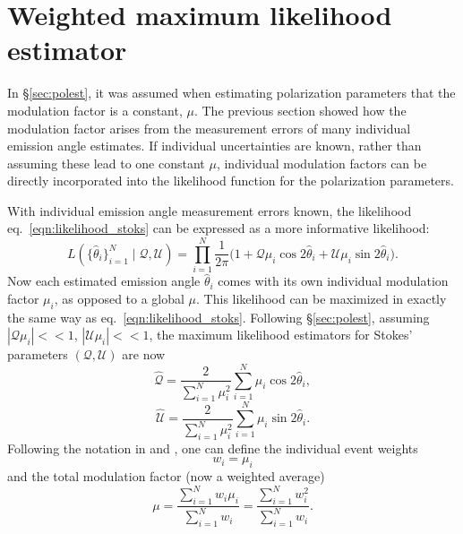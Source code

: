 \section{Weighted maximum likelihood estimator}
In \S\ref{sec:polest}, it was assumed when estimating polarization parameters that the modulation factor is a constant, $\mu$. The previous section showed how the modulation factor arises from the measurement errors of many individual emission angle estimates. If individual uncertainties are known, rather than assuming these lead to one constant $\mu$, individual modulation factors can be directly incorporated into the likelihood function for the polarization parameters. 

With individual emission angle measurement errors known, the likelihood eq.~\ref{eqn:likelihood_stoks} can be expressed as a more informative likelihood:
\begin{equation}
    L(\{\hat{\theta}_i\}_{i=1}^N\mid\mathcal{Q},\mathcal{U}) =  \prod_{i=1}^N\frac{1}{2\pi} \big(1 + \mathcal{Q}\mu_i\cos2\hat{\theta}_i + \mathcal{U}\mu_i\sin2\hat{\theta}_i \big).
    \label{eqn:prob_stoks}
\end{equation}
Now each estimated emission angle $\hat{\theta}_i$ comes with its own individual modulation factor $\mu_i$, as opposed to a global $\mu$. This likelihood can be maximized in exactly the same way as eq.~\ref{eqn:likelihood_stoks}. Following \S\ref{sec:polest}, assuming $|\mathcal{Q}\mu_i| << 1$, $|\mathcal{U}\mu_i| << 1$, the maximum likelihood estimators for Stokes' parameters $(\mathcal{Q}, \mathcal{U})$ are now
\begin{equation}
    \hat{\mathcal{Q}} = \frac{2}{\sum_{i=1}^N\mu_i^2} \sum^N_{i=1}\mu_i\cos2\hat{\theta}_i,
    \label{eqn:qestw}
\end{equation}
\begin{equation}
    \hat{\mathcal{U}} = \frac{2}{\sum_{i=1}^N\mu_i^2} \sum^N_{i=1}\mu_i\sin2\hat{\theta}_i.
    \label{eqn:uestw}
\end{equation}
Following the notation in \citet{kislat_analyzing_2015} and \citet{peirson_towards_2021}, one can define the individual event weights
\begin{equation}
    w_i = \mu_i
\end{equation}
and the total modulation factor (now a weighted average)
\begin{equation}
    \mu = \frac{\sum^N_{i=1} w_i\mu_i}{\sum_{i=1}^N w_i} = \frac{\sum^N_{i=1} w_i^2}{\sum_{i=1}^N w_i}.
\end{equation}                                     
